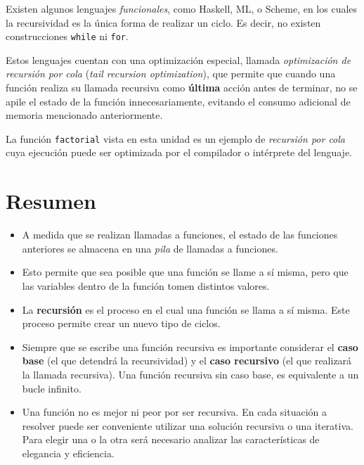 \begin{sabias_que}
Existen algunos lenguajes {\it funcionales}, como Haskell, ML, o Scheme, en
los cuales la recursividad es la única forma de realizar un ciclo.  Es
decir, no existen construcciones {\tt while} ni {\tt for}. 

Estos lenguajes cuentan con una optimización especial, llamada {\it
optimización de recursión por cola} ({\it tail recursion optimization}),
que permite que cuando una función realiza su llamada recursiva como {\bf
última} acción antes de terminar, no se apile el estado de la función
innecesariamente, evitando el consumo adicional de memoria mencionado
anteriormente.

La función \lstinline!factorial! vista en esta unidad es un ejemplo de {\it
recursión por cola} cuya ejecución puede ser optimizada por el compilador o
intérprete del lenguaje.
\end{sabias_que}

\section{Resumen}

\begin{itemize}

\item A medida que se realizan llamadas a funciones, el estado de las
funciones anteriores se almacena en una {\it pila} de llamadas a funciones.

\item Esto permite que sea posible que una función se llame a sí misma,
pero que las variables dentro de la función tomen distintos valores.

\item La {\bf recursión} es el proceso en el cual una función se llama a
sí misma.  Este proceso permite crear un nuevo tipo de ciclos.

\item Siempre que se escribe una función recursiva es importante considerar
el {\bf caso base} (el que detendrá la recursividad) y el {\bf caso
recursivo} (el que realizará la llamada recursiva).  Una función recursiva
sin caso base, es equivalente a un bucle infinito.

\item Una función no es mejor ni peor por ser recursiva.  En cada situación
a resolver puede ser conveniente utilizar una solución recursiva o una
iterativa.  Para elegir una o la otra será necesario analizar las
características de elegancia y eficiencia.

\end{itemize}


